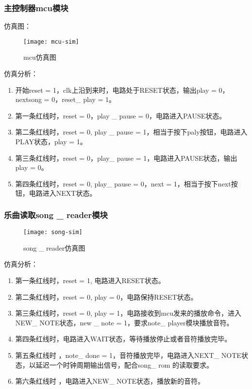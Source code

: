 \documentclass{../source/Experiment}
\begin{document}
            \subsubsection{主控制器mcu模块}
            仿真图：
                \begin{figure}[H]
                    \centering
                    \texttt{[image: mcu-sim]}
                    \caption{mcu仿真图}
                \end{figure}
            仿真分析：

            \begin{enumerate}
                \item 开始reset = 1，clk上沿到来时，电路处于RESET状态，输出play = 0，nextsong = 0，reset\_ play = 1。 
                \item 第一条红线时，reset = 0，play \_ pause = 0，电路进入PAUSE状态。
                \item 第二条红线时，reset = 0, play \_ pause = 1，相当于按下paly按钮，电路进入PLAY状态，play = 1。 
                \item 第三条红线时，reset = 0，play\_ pause = 1，电路进入PAUSE状态，输出play = 0。 
                \item 第四条红线时，reset = 0, play\_ pause = 0，next = 1，相当于按下next按钮，电路进入NEXT状态。
            \end{enumerate}

            \subsubsection{乐曲读取song \_ reader模块}
                \begin{figure}[H]
                    \centering
                    \texttt{[image: song-sim]}
                    \caption{song \_ reader仿真图}
                \end{figure}

            仿真分析：

            \begin{enumerate}
                \item 第一条红线时，reset = 1, 电路进入RESET状态。
                \item 第二条红线时，reset = 0, play = 0，电路保持RESET状态。
                \item 第三条红线时，reset = 0, play = 1，电路接收到mcu发来的播放命令，进入NEW\_ NOTE状态，new \_ note = 1，要求note\_ player模块播放音符。 
                \item 第四条红线时，电路进入WAIT状态，等待播放停止或者音符播放完毕。
                \item 第五条红线时 ，note\_ done = 1，音符播放完毕，电路进入NEXT\_ NOTE状态，以延迟一个时钟周期输出信号，配合song\_ rom 的读取要求。
                \item 第六条红线时 ，电路进入NEW\_ NOTE状态，播放新的音符。
            \end{enumerate}
\end{document}
